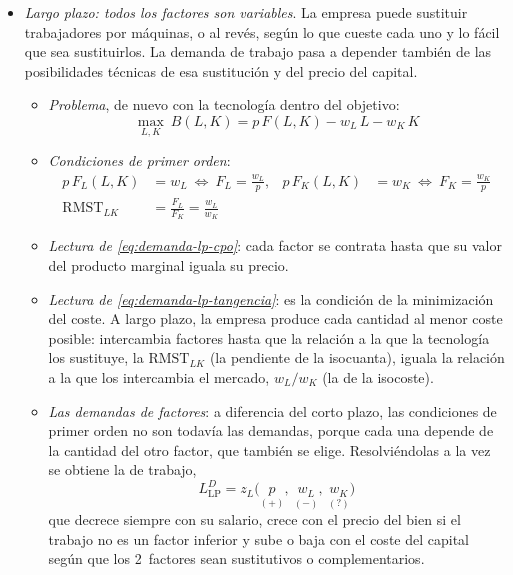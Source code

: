 \documentclass[11pt]{article}
\begin{document}
\begin{itemize}
\item \emph{Largo plazo: todos los factores son variables}. La empresa puede sustituir trabajadores por máquinas, o al revés, según lo que cueste cada uno y lo fácil que sea sustituirlos. La demanda de trabajo pasa a depender también de las posibilidades técnicas de esa sustitución y del precio del capital.
  \begin{itemize}
  \item \emph{Problema}, de nuevo con la tecnología dentro del objetivo:
    \[
    \max_{L,K}\ B(L,K)=p\,F(L,K)-w_L\,L-w_K\,K
    \]
  \item \emph{Condiciones de primer orden}:
    \begin{align}
    p\,F_L(L,K)&=w_L\ \Longleftrightarrow\ F_L=\frac{w_L}{p}, & p\,F_K(L,K)&=w_K\ \Longleftrightarrow\ F_K=\frac{w_K}{p}\label{eq:demanda-lp-cpo}\\
    \mathrm{RMST}_{LK}&=\frac{F_L}{F_K}=\frac{w_L}{w_K} & & \label{eq:demanda-lp-tangencia}
    \end{align}
  \item \emph{Lectura de \eqref{eq:demanda-lp-cpo}}: cada factor se contrata hasta que su valor del producto marginal iguala su precio.
  \item \emph{Lectura de \eqref{eq:demanda-lp-tangencia}}: es la condición de la minimización del coste. A largo plazo, la empresa produce cada cantidad al menor coste posible: intercambia factores hasta que la relación a la que la tecnología los sustituye, la $\mathrm{RMST}_{LK}$ (la pendiente de la isocuanta), iguala la relación a la que los intercambia el mercado, $w_L/w_K$ (la de la isocoste).
  \item \emph{Las demandas de factores}: a diferencia del corto plazo, las condiciones de primer orden no son todavía las demandas, porque cada una depende de la cantidad del otro factor, que también se elige. Resolviéndolas a la vez se obtiene la  de trabajo,
    \[
    L^D_{\mathrm{LP}}=z_L\Big(\underset{(+)}{p},\ \underset{(-)}{w_L},\ \underset{(?)}{w_K}\Big)
    \]
    que decrece siempre con su salario, crece con el precio del bien si el trabajo no es un factor inferior y sube o baja con el coste del capital según que los 2~factores sean sustitutivos o complementarios.
  \end{itemize}
\end{itemize}
\end{document}
